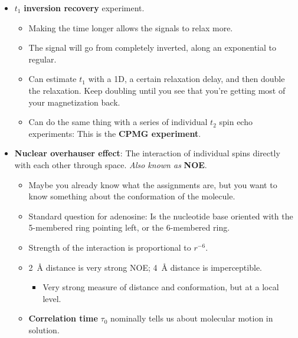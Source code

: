 \documentclass[../notes.tex]{subfiles}
\begin{document}
\begin{itemize}
\begin{itemize}
        \item Useful for connecting protons through overlapping peaks! If two carbons have the same chemical shift but differing neighbors, we can TOCSY the neighbors directly instead of having to go through the COSY.
        \item When you make the mixing period less (\SI{20}{\milli\second} or \SI{10}{\milli\second}), you get fewer transfers of magnetization and see nearer neighbors only.
    \end{itemize}
    \item $t_1$ \textbf{inversion recovery} experiment.
    \begin{itemize}
        \item Making the time longer allows the signals to relax more.
        \item The signal will go from completely inverted, along an exponential to regular.
        \item Can estimate $t_1$ with a 1D, a certain relaxation delay, and then double the relaxation. Keep doubling until you see that you're getting most of your magnetization back.
        \item Can do the same thing with a series of individual $t_2$ spin echo experiments: This is the \textbf{CPMG experiment}.
    \end{itemize}
    \item \textbf{Nuclear overhauser effect}: The interaction of individual spins directly with each other through space. \emph{Also known as} \textbf{NOE}.
    \begin{itemize}
        \item Maybe you already know what the assignments are, but you want to know something about the conformation of the molecule.
        \item Standard question for adenosine: Is the nucleotide base oriented with the 5-membered ring pointing left, or the 6-membered ring.
        \item Strength of the interaction is proportional to $r^{-6}$.
        \item \SI{2}{\angstrom} distance is very strong NOE; \SI{4}{\angstrom} distance is imperceptible.
        \begin{itemize}
            \item Very strong measure of distance and conformation, but at a local level.
        \end{itemize}
        \item \textbf{Correlation time} $\tau_0$ nominally tells us about molecular motion in solution.

\end{itemize}
\end{itemize}
\end{document}

